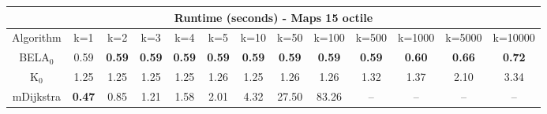 \begin{tabular}{c|cccccccccccc}\toprule
\multicolumn{13}{c}{Runtime (seconds) - Maps 15 octile}\\ \midrule
Algorithm & k=1 & k=2 & k=3 & k=4 & k=5 & k=10 & k=50 & k=100 & k=500 & k=1000 & k=5000 & k=10000 \\ \midrule
BELA$_0$ & 0.59 & \textbf{0.59} & \textbf{0.59} & \textbf{0.59} & \textbf{0.59} & \textbf{0.59} & \textbf{0.59} & \textbf{0.59} & \textbf{0.59} & \textbf{0.60} & \textbf{0.66} & \textbf{0.72} \\
K$_0$ & 1.25 & 1.25 & 1.25 & 1.25 & 1.26 & 1.25 & 1.26 & 1.26 & 1.32 & 1.37 & 2.10 & 3.34 \\
mDijkstra & \textbf{0.47} & 0.85 & 1.21 & 1.58 & 2.01 & 4.32 & 27.50 & 83.26 & -- & -- & -- & -- \\ \bottomrule 
\end{tabular}
